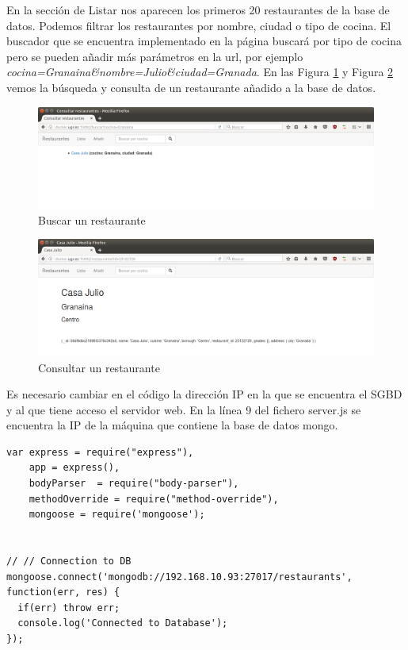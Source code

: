 En la sección de Listar nos aparecen los primeros 20 restaurantes de la base de datos. Podemos filtrar los restaurantes por nombre, ciudad o tipo de cocina. El buscador que se encuentra implementado en la página buscará por tipo de cocina pero se pueden añadir más parámetros en la url, por ejemplo \textit{cocina=Granaina\&nombre=Julio\&ciudad=Granada}. En las Figura \ref{fig:buscar} y Figura \ref{fig:consultar} vemos la búsqueda y consulta de un restaurante añadido a la base de datos. \\

\begin{figure}[h!]
	\centering
	\includegraphics[width=13cm]{./images/buscar}
	\caption{Buscar un restaurante} 
	\label{fig:buscar}
\end{figure}

\begin{figure}[h!]
	\centering
	\includegraphics[width=13cm]{./images/consultar}
	\caption{Consultar un restaurante} 
	\label{fig:consultar}
\end{figure}

Es necesario cambiar en el código la dirección IP en la que se encuentra el SGBD y al que tiene acceso el servidor web. En la línea 9 del fichero server.js se encuentra la IP de la máquina que contiene la base de datos mongo. \\

\begin{lstlisting}
var express = require("express"),  
    app = express(),
    bodyParser  = require("body-parser"),
    methodOverride = require("method-override"),
    mongoose = require('mongoose');
	
	
// // Connection to DB
mongoose.connect('mongodb://192.168.10.93:27017/restaurants', function(err, res) {
  if(err) throw err;
  console.log('Connected to Database');
});
\end{lstlisting}

